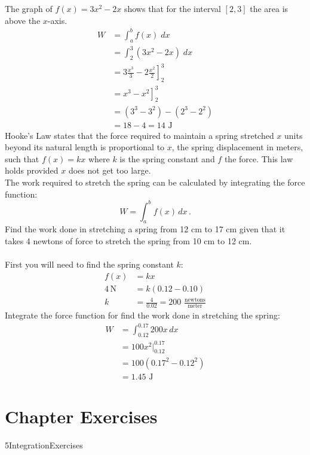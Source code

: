 \solution The graph of $f (x) =3 x^{2} -2 x$ shows that for the interval $\left [2 ,3\right ]$ the area is above the $x$-axis.
\begin{align*}W &  = \int _{a}^{b}f (x)\; d x \\
 &  = \int _{2}^{3}\left (3 x^{2} -2 x\right )\; d x \\
 &  = \left .3 \frac{x^{3}}{3} -2 \frac{x^{2}}{2}\right ]_{2}^{3} \\
 &  = \left .x^{3} -x^{2}\right ]_{2}^{3} \\
 &  = \left (3^{3} -3^{2}\right ) -\left (2^{3} -2^{2}\right ) \\
 &  = 18 -4 =14\text{ J}\end{align*}
\clearpage
\examq Hooke's Law states that the force required to maintain a spring stretched $x$ units beyond its natural length is proportional to $x$, the spring displacement in meters, such that $f (x) =k x$ where $k$ is the spring constant and $f$ the force. This law holds provided $x$ does not get too large. \medskip\\
The work required to stretch the spring can be calculated by integrating the force function:
\[W=\int_{a}^{b}f(x) \, dx\,. \]
Find the work done in stretching a spring from 12 cm to 17 cm given that it takes 4 newtons of force to stretch the spring from 10 cm to 12 cm. \\
\solution\medskip\\
First you will need to find the spring constant $k$:
\begin{align*}f(x)&=kx\\
4\,\text{N}&=k(0.12-0.10)\\
k&=\frac{4}{0.02}=200\,\,\frac{\text{newtons}}{\text{meter}}
\end{align*}
Integrate the force function for find the work done in stretching the spring:
\begin{align*}
W&=\int_{0.12}^{0.17}200x\,dx\\
&=100x^2\Big\vert_{0.12}^{0.17}\\
&=100(0.17^2-0.12^2)\\
&=1.45 \text{ J}
\end{align*}
\clearpage
\section{Chapter Exercises}
{5IntegrationExercises}


 



